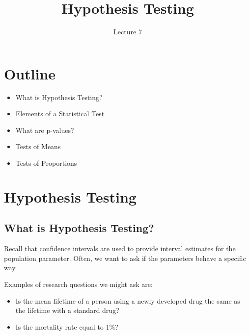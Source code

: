 \documentclass[
  letterpaper,
  DIV=11,
  numbers=noendperiod]{scrartcl}
\title{Hypothesis Testing}
\subtitle{Lecture 7}
\author{}
\date{}
\providecommand{\tightlist}{%
  \setlength{\itemsep}{0pt}\setlength{\parskip}{0pt}}
\begin{document}
\maketitle


\section{Outline}\label{outline}

\begin{itemize}
\tightlist
\item
  What is Hypothesis Testing?
\item
  Elements of a Statistical Test
\item
  What are p-values?
\item
  Tests of Means
\item
  Tests of Proportions
\end{itemize}

\section{Hypothesis Testing}\label{hypothesis-testing}

\subsection{What is Hypothesis
Testing?}\label{what-is-hypothesis-testing}

Recall that confidence intervals are used to provide interval estimates
for the population parameter. Often, we want to ask if the parameters
behave a specific way.

\begin{tcolorbox}[enhanced jigsaw, bottomtitle=1mm, colback=white, opacityback=0, leftrule=.75mm, opacitybacktitle=0.6, coltitle=black, left=2mm, colframe=quarto-callout-important-color-frame, toptitle=1mm, colbacktitle=quarto-callout-important-color!10!white, titlerule=0mm, title=\textcolor{quarto-callout-important-color}{\faExclamation}\hspace{0.5em}{Important}, arc=.35mm, rightrule=.15mm, breakable, bottomrule=.15mm, toprule=.15mm]

Examples of research questions we might ask are:

\begin{itemize}
\tightlist
\item
  Is the mean lifetime of a person using a newly developed drug the same
  as the lifetime with a standard drug?
\item
  Is the mortality rate equal to 1\%?
\end{itemize}

\end{tcolorbox}
\end{document}
